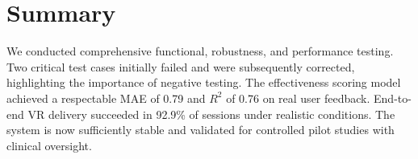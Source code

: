 \section{Summary}

We conducted comprehensive functional, robustness, and performance testing. Two critical test cases initially failed and were subsequently corrected, highlighting the importance of negative testing. The effectiveness scoring model achieved a respectable MAE of 0.79 and $R^2$ of 0.76 on real user feedback. End-to-end VR delivery succeeded in 92.9\% of sessions under realistic conditions. The system is now sufficiently stable and validated for controlled pilot studies with clinical oversight.
